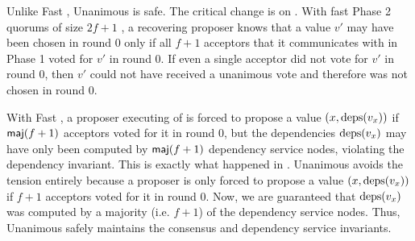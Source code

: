 {}

Unlike Fast \BPaxos{}, Unanimous \BPaxos{} is safe. The critical change is on
. With fast Phase 2 quorums of size $2f+1$
%
, a recovering proposer knows that
a value $v'$ may have been chosen in round $0$ only if all $f+1$ acceptors that
it communicates with in Phase 1 voted for $v'$ in round $0$. If even a single
acceptor did not vote for $v'$ in round $0$, then $v'$ could not have received
a unanimous vote and therefore was not chosen in round 0.

With Fast \BPaxos{}, a proposer executing  of
 is forced to propose a value $(x, \text{deps}(v_x))$ if
$\textsf{maj}(f+1)$ acceptors voted for it in round $0$, but the dependencies
$\text{deps}(v_x)$ may have only been computed by $\textsf{maj}(f+1)$ dependency service
nodes, violating the dependency invariant. This is exactly what happened in
. Unanimous \BPaxos{} avoids the tension entirely because
a proposer is only forced to propose a value $(x, \text{deps}(v_x))$ if $f+1$
acceptors voted for it in round $0$. Now, we are guaranteed that $\text{deps}(v_x)$
was computed by a majority (i.e. $f+1$) of the dependency service nodes. Thus,
Unanimous \BPaxos{} safely maintains the consensus and dependency service
invariants.

